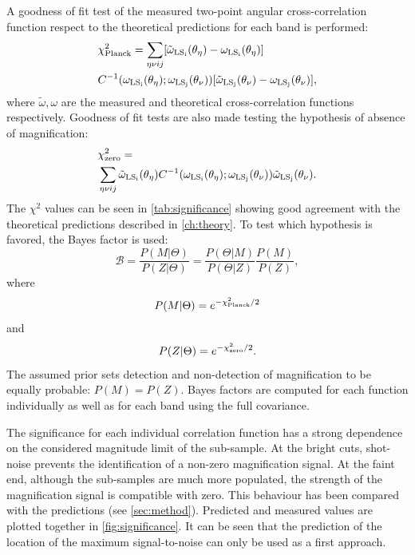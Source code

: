 \newline

A goodness of fit test of the measured two-point angular cross-correlation function respect to the theoretical predictions for each band is performed:
\begin{eqnarray}
&\chi^2_{\rm Planck} =\sum\limits_{\eta\nu ij}[\tilde \omega_{\rm LS_i}(\theta_\eta)-\omega_{\rm LS_i}(\theta_\eta)]\\
&C^{-1}(\omega_{\rm LS_i}(\theta_\eta);\omega_{\rm LS_j}(\theta_\nu))[\tilde \omega_{\rm LS_j}(\theta_\nu)-\omega_{\rm LS_j}(\theta_\nu)],
\end{eqnarray}
where $\tilde\omega,\omega$ are the measured and theoretical cross-correlation functions respectively. Goodness of fit tests are also made testing the hypothesis of absence of magnification:
\begin{eqnarray}
&\chi^2_{\rm zero}=\\
&\sum\limits_{\eta\nu ij}\tilde\omega_{\rm LS_i}(\theta_\eta)C^{-1}(\omega_{\rm LS_i}(\theta_\eta);\omega_{\rm LS_j}(\theta_\nu))\tilde\omega_{\rm LS_j}(\theta_\nu)\nonumber.
\end{eqnarray}
The $\chi^2$ values can be seen in \autoref{tab:significance} showing good agreement with the theoretical predictions described in \autoref{ch:theory}. To test which hypothesis is favored, the Bayes factor is used:
\begin{equation}
\mathcal{B} = \frac{P(M|\Theta)}{P(Z|\Theta)} = \frac{P(\Theta |M)}{P(\Theta|Z)}\frac{P(M)}{P(Z)},
\end{equation}
where 
\begin{equation}
P(M|\Theta) = e^{-\chi^2_{\rm Planck}/2}
\end{equation}
and
\begin{equation}
P(Z|\Theta) = e^{-\chi^2_{\rm zero}/2}.
\end{equation}
The assumed prior sets detection and non-detection of magnification to be equally probable: $P(M) = P(Z)$. Bayes factors are computed for each function individually as well as for each band using the full covariance.
\newline

The significance for each individual correlation function has a strong dependence on the considered magnitude limit of the sub-sample. At the bright cuts, shot-noise prevents the identification of a non-zero magnification signal. At the faint end, although the sub-samples are much more populated, the strength of the magnification signal is compatible with zero. This behaviour has been compared with the predictions (see \autoref{sec:method}). Predicted and measured values are plotted together in \autoref{fig:significance}. It can be seen that the prediction of the location of the maximum signal-to-noise can only be used as a first approach.
\newline

